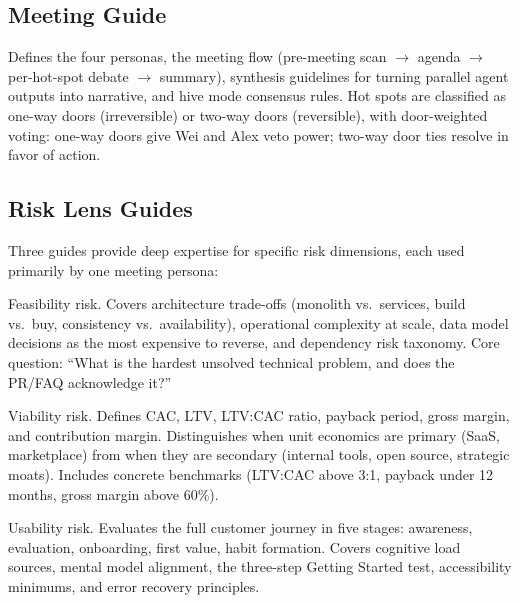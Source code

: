 \documentclass[11pt,letterpaper]{article}
\begin{document}
\subsection{Meeting Guide}

\begin{description}[style=nextline, leftmargin=2em]
  \item[\texttt{meeting-guide.md}]
    Defines the four personas, the meeting flow (pre-meeting scan $\to$ agenda
    $\to$ per-hot-spot debate $\to$ summary), synthesis guidelines for turning
    parallel agent outputs into narrative, and hive mode consensus rules.
    Hot spots are classified as one-way doors (irreversible) or two-way doors
    (reversible), with door-weighted voting: one-way doors give Wei and Alex
    veto power; two-way door ties resolve in favor of action.
\end{description}

\subsection{Risk Lens Guides}

Three guides provide deep expertise for specific risk dimensions, each used
primarily by one meeting persona:

\begin{description}[style=nextline, leftmargin=2em]
  \item[\texttt{principal-engineer.md} (Wei)]
    Feasibility risk. Covers architecture trade-offs (monolith vs.\ services,
    build vs.\ buy, consistency vs.\ availability), operational complexity at
    scale, data model decisions as the most expensive to reverse, and dependency
    risk taxonomy. Core question: ``What is the hardest unsolved technical
    problem, and does the PR/FAQ acknowledge it?''

  \item[\texttt{unit-economics.md} (Alex)]
    Viability risk. Defines CAC, LTV, LTV:CAC ratio, payback period, gross
    margin, and contribution margin. Distinguishes when unit economics are
    primary (SaaS, marketplace) from when they are secondary (internal tools,
    open source, strategic moats). Includes concrete benchmarks (LTV:CAC above
    3:1, payback under 12 months, gross margin above 60\%).

  \item[\texttt{ux-bar-raiser.md} (Priya)]
    Usability risk. Evaluates the full customer journey in five stages: awareness,
    evaluation, onboarding, first value, habit formation. Covers cognitive load
    sources, mental model alignment, the three-step Getting Started test,
    accessibility minimums, and error recovery principles.
\end{description}
\end{document}
